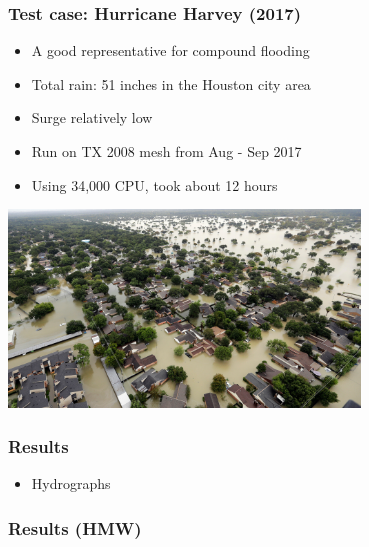 \documentclass[10pt]{beamer}
\begin{document}
\begin{frame}
  \frametitle{Test case: Hurricane Harvey (2017)}
  \begin{itemize}
  \item A good representative for compound flooding
  \item Total rain: 51 inches in the Houston city area
  \item Surge relatively low
  \item Run on TX 2008 mesh from Aug - Sep 2017
  \item Using 34,000 CPU, took about 12 hours
  \end{itemize}
  \includegraphics[width=0.7\textwidth]{harvey.jpg}
\end{frame}
\begin{frame}
  \frametitle{Results}
  \begin{itemize}
  \item Hydrographs
  \end{itemize}
\end{frame}

\begin{frame}
  \frametitle{Results (HMW)}
\end{frame}
\end{document}

